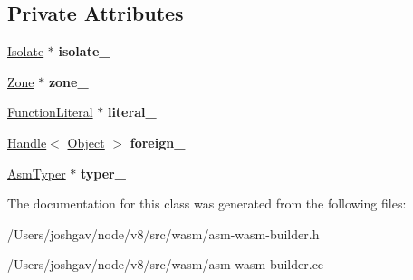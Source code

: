 \subsection*{Private Attributes}
\begin{DoxyCompactItemize}
\item 
\hyperlink{classv8_1_1internal_1_1_isolate}{Isolate} $\ast$ {\bfseries isolate\+\_\+}\hypertarget{classv8_1_1internal_1_1wasm_1_1_asm_wasm_builder_a9ac5e06a859389d05dbbee19a2a06a26}{}\label{classv8_1_1internal_1_1wasm_1_1_asm_wasm_builder_a9ac5e06a859389d05dbbee19a2a06a26}

\item 
\hyperlink{classv8_1_1internal_1_1_zone}{Zone} $\ast$ {\bfseries zone\+\_\+}\hypertarget{classv8_1_1internal_1_1wasm_1_1_asm_wasm_builder_a47953bf830868f4115ee834a0b209741}{}\label{classv8_1_1internal_1_1wasm_1_1_asm_wasm_builder_a47953bf830868f4115ee834a0b209741}

\item 
\hyperlink{classv8_1_1internal_1_1_function_literal}{Function\+Literal} $\ast$ {\bfseries literal\+\_\+}\hypertarget{classv8_1_1internal_1_1wasm_1_1_asm_wasm_builder_a86bdabadc625092bb30fa98fc3cc746f}{}\label{classv8_1_1internal_1_1wasm_1_1_asm_wasm_builder_a86bdabadc625092bb30fa98fc3cc746f}

\item 
\hyperlink{classv8_1_1internal_1_1_handle}{Handle}$<$ \hyperlink{classv8_1_1internal_1_1_object}{Object} $>$ {\bfseries foreign\+\_\+}\hypertarget{classv8_1_1internal_1_1wasm_1_1_asm_wasm_builder_a17af30022acbc2c241f370a0046e6e60}{}\label{classv8_1_1internal_1_1wasm_1_1_asm_wasm_builder_a17af30022acbc2c241f370a0046e6e60}

\item 
\hyperlink{classv8_1_1internal_1_1_asm_typer}{Asm\+Typer} $\ast$ {\bfseries typer\+\_\+}\hypertarget{classv8_1_1internal_1_1wasm_1_1_asm_wasm_builder_ac3539654de99e2e7d5226296c7f058d7}{}\label{classv8_1_1internal_1_1wasm_1_1_asm_wasm_builder_ac3539654de99e2e7d5226296c7f058d7}

\end{DoxyCompactItemize}


The documentation for this class was generated from the following files\+:\begin{DoxyCompactItemize}
\item 
/\+Users/joshgav/node/v8/src/wasm/asm-\/wasm-\/builder.\+h\item 
/\+Users/joshgav/node/v8/src/wasm/asm-\/wasm-\/builder.\+cc\end{DoxyCompactItemize}
